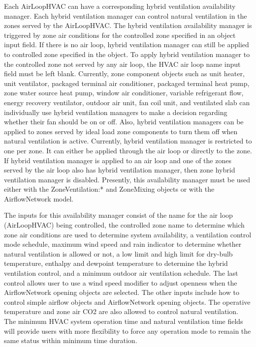 Each AirLoopHVAC can have a corresponding hybrid ventilation availability manager. Each hybrid ventilation manager can control natural ventilation in the zones served by the AirLoopHVAC. The hybrid ventilation availability manager is triggered by zone air conditions for the controlled zone specified in an object input field. If there is no air loop, hybrid ventilation manager can still be applied to controlled zone specified in the object. To apply hybrid ventilation manager to the controlled zone not served by any air loop, the HVAC air loop name input field must be left blank. Currently, zone component objects such as unit heater, unit ventilator, packaged terminal air conditioner, packaged terminal heat pump, zone water source heat pump, window air conditioner, variable refrigerant flow, energy recovery ventilator, outdoor air unit, fan coil unit, and ventilated slab can individually use hybrid ventilation managers to make a decision regarding whether their fan should be on or off. Also, hybrid ventilation managers can be applied to zones served by ideal load zone components to turn them off when natural ventilation is active. Currently, hybrid ventilation manager is restricted to one per zone. It can either be applied through the air loop or directly to the zone. If hybrid ventilation manager is applied to an air loop and one of the zones served by the air loop also has hybrid ventilation manager, then zone hybrid ventilation manager is disabled. Presently, this availability manager must be used either with the ZoneVentilation:* and ZoneMixing objects or with the AirflowNetwork model.

The inputs for this availability manager consist of the name for the air loop (AirLoopHVAC) being controlled, the controlled zone name to determine which zone air conditions are used to determine system availability, a ventilation control mode schedule, maximum wind speed and rain indicator to determine whether natural ventilation is allowed or not, a low limit and high limit for dry-bulb temperature, enthalpy and dewpoint temperature to determine the hybrid ventilation control, and a minimum outdoor air ventilation schedule. The last control allows user to use a wind speed modifier to adjust openness when the AirflowNetwork opening objects are selected. The other inputs include how to control simple airflow objects and AirflowNetwork opening objects. The operative temperature and zone air CO2 are also allowed to control natural ventilation. The minimum HVAC system operation time and natural ventilation time fields will provide users with more flexibility to force any operation mode to remain the same status within minimum time duration.

